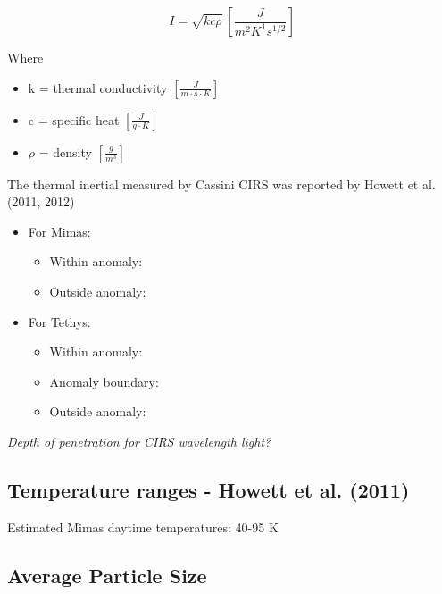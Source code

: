 \documentclass[11pt]{article} %
\begin{document}
\begin{itemize}
	\begin{equation}
	I = \sqrt{kc\rho} \: [\frac{J}{m^{2} K^{1} s^{1/2}}]
	\end{equation}

	\hspace{1cm}
	Where
	\begin{itemize}[leftmargin=3cm]
	\item k = thermal conductivity $[\frac{J}{m \cdot s \cdot K}]$
	\item c = specific heat $[\frac{J}{g \cdot K}]$
	\item $\rho$ = density $[\frac{g}{m^{3}}]$
	\end{itemize}

	The thermal inertial measured by Cassini CIRS was reported by Howett et al. (2011, 2012)
	\begin{itemize}
		\item For Mimas:
		\begin{itemize}
			\item Within anomaly: 
			\item Outside anomaly: 
		\end{itemize}
		\item For Tethys:
		\begin{itemize}
			\item Within anomaly: 
			\item Anomaly boundary: 
			\item Outside anomaly: 
		\end{itemize}
	\end{itemize}
		
	\emph{Depth of penetration for CIRS wavelength light?}
	
\subsection{Temperature ranges - Howett et al. (2011)}
\label{sec:temperature}

	Estimated Mimas daytime temperatures: 40-95 K
	
\subsection{Average Particle Size}
\label{sec:size}

	

\end{itemize}
\end{document}
